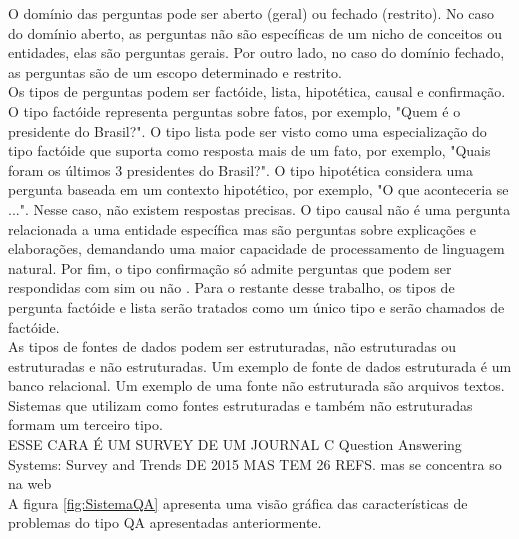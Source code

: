 \documentclass{article}
\begin{document}
O domínio das perguntas pode ser aberto (geral) ou fechado (restrito). No caso do domínio aberto, as perguntas não são específicas de um nicho de conceitos ou entidades, elas são perguntas gerais. Por outro lado, no caso do domínio fechado, as perguntas são de um escopo determinado e restrito.\\

Os tipos de perguntas podem ser factóide, lista, hipotética, causal e confirmação. O tipo factóide representa perguntas sobre fatos, por exemplo, "Quem é o presidente do Brasil?". O tipo lista pode ser visto como uma especialização do tipo factóide que suporta como resposta mais de um fato, por exemplo, "Quais foram os últimos 3 presidentes do Brasil?". O tipo hipotética considera uma pergunta baseada em um contexto hipotético, por exemplo, "O que aconteceria se ...". Nesse caso, não existem respostas precisas. O tipo causal não é uma pergunta relacionada a uma entidade específica mas são perguntas sobre explicações e elaborações, demandando uma maior capacidade de processamento de linguagem natural. Por fim, o tipo confirmação só admite perguntas que podem ser respondidas com sim ou não \citep{mishra2016survey}. Para o restante desse trabalho, os tipos de pergunta factóide e lista serão tratados como um único tipo e serão chamados de factóide.\\

As tipos de fontes de dados podem ser estruturadas, não estruturadas ou estruturadas e não estruturadas. Um exemplo de fonte de dados estruturada é um banco relacional. Um exemplo de uma fonte não estruturada são arquivos textos. Sistemas que utilizam como fontes estruturadas e também não estruturadas formam um terceiro tipo.\\

ESSE CARA É UM SURVEY DE UM JOURNAL  C Question Answering Systems: Survey and Trends DE 2015 MAS TEM 26 REFS. mas se concentra so na web\\

A figura \ref{fig:SistemaQA} apresenta uma visão gráfica das características de problemas do tipo QA apresentadas anteriormente.\\
\end{document}
